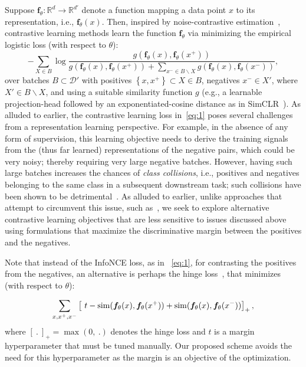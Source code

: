 \documentclass[letterpaper]{article} \usepackage{aaai22}  \usepackage{times}  \usepackage{helvet}  \usepackage{courier}  \usepackage[hyphens]{url}  \usepackage{graphicx} \urlstyle{rm} \def\UrlFont{\rm}  \usepackage{natbib}  \usepackage{caption} \DeclareCaptionStyle{ruled}{labelfont=normalfont,labelsep=colon,strut=off} \frenchspacing  \setlength{\pdfpagewidth}{8.5in}  \setlength{\pdfpageheight}{11in}
\newcommand{\vx}{x}\newcommand{\px}{x^+}\newcommand{\nx}{x^{-}} \newcommand{\vz}{\bm{z}}
\newcommand{\dataset}{\mathcal{D}}
\newcommand{\batch}{B}
\newcommand{\sX}{{X}}
\newcommand{\ft}{\bm{f}_\theta}
\newcommand{\hinge}[1]{\left[#1\right]_+}
\newcommand{\set}[1]{\left\{#1\right\}}
\newcommand{\reals}[1]{\mathbb{R}^{#1}}
\DeclareMathOperator{\dist}{sim}
\begin{document}
Suppose $\ft\!:\reals{d}\to\reals{d'}$ denote a function mapping a data point $\vx$ to its representation, i.e., $\ft(\vx)$. Then, inspired by noise-contrastive estimation~\cite{gutmann2010noise}, contrastive learning methods learn the function $\ft$ via minimizing the empirical logistic loss (with respect to $\theta$):
\begin{equation}
 -\!\!\sum\limits_{\sX\in\batch}\!\!\log\frac{g(\ft(\vx), \ft(\px))}{g(\ft(\vx),\ft(\px))+ \sum_{\nx\in\batch\backslash\sX}g(\ft(\vx),\ft(\nx))},
    \label{eq:1}
\end{equation}
over batches $\batch\subset\dataset'$ with positives $\set{\vx,\px}\subset\sX\in\batch$, negatives $\nx\in\sX'$, where $\sX'\in\batch\backslash\sX$, and using a suitable similarity function $g$ (e.g., a learnable projection-head followed by an exponentiated-cosine distance as in SimCLR~\cite{chen2020simple}). 
As alluded to earlier, the contrastive learning loss in~\eqref{eq:1} poses several challenges from a representation learning perspective. For example, in the absence of any form of supervision, this learning objective needs to derive the training signals from the (thus far learned) representations of the negative pairs, which could be very noisy; thereby requiring very large negative batches. However, having such large batches increases the chances of \emph{class collisions}, i.e., positives and negatives belonging to the same class in a subsequent downstream task; such collisions have been shown to be detrimental~\cite{arora2019theoretical}. As alluded to earlier, unlike approaches that attempt to circumvent this issue, such as~\cite{huynh2020boosting,robinson2021contrastive,chuang2020debiased}, we seek to explore alternative contrastive learning objectives that are less sensitive to issues discussed above using formulations that maximize the discriminative margin between the positives and the negatives. 

Note that instead of the InfoNCE loss, as in ~\eqref{eq:1}, for contrasting the positives from the negatives, an alternative is perhaps the hinge loss~\cite{arora2019theoretical,chen2020simple}, that minimizes (with respect to $\theta$):

\begin{equation}
     \sum_{\vx, \px, \nx} \hinge{\ t - \dist(\ft(\vx), \ft(\px)) + \dist(\ft(x), \ft(\nx))},\notag
\end{equation}
where $\hinge{\ .\ }=\max(0,\ .)$ denotes the hinge loss and $t$ is a margin hyperparameter that must be tuned manually. Our proposed scheme avoids the need for this hyperparameter as the margin is an objective of the optimization.
\end{document}

